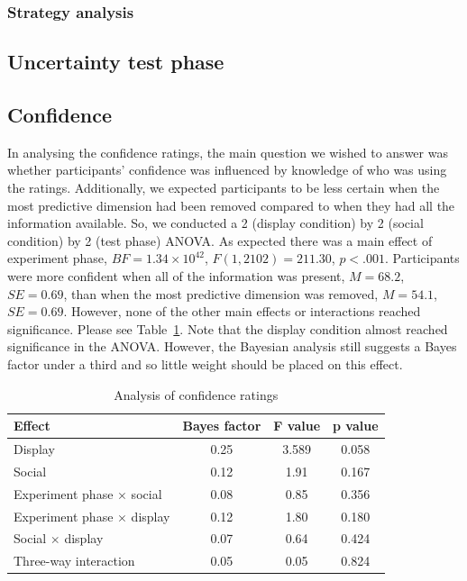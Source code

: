 \documentclass[doc, a4paper, apacite]{apa6}
\begin{document}
\subsubsection{Strategy analysis}



\subsection{Uncertainty test phase}

\subsection{Confidence}
In analysing the confidence ratings, the main question we wished to answer was whether participants' confidence was influenced by knowledge of who was using the ratings. 
Additionally, we expected participants to be less certain when the most predictive dimension had been removed compared to when they had all the information available. 
So, we conducted a 2 (display condition) by 2 (social condition) by 2 (test phase) ANOVA. 
As expected there was a main effect of experiment phase, $BF=1.34 \times 10^{42}$, $F(1, 2102)=211.30$, $p<.001$. 
Participants were more confident when all of the information was present, $M=68.2$, $SE=0.69$, than when the most predictive dimension was removed, $M=54.1$, $SE=0.69$. 
However, none of the other main effects or interactions reached significance. 
Please see Table~\ref{table:confidenceAnalysis}. 
Note that the display condition almost reached significance in the ANOVA. 
However, the Bayesian analysis still suggests a Bayes factor under a third and so little weight should be placed on this effect. 

\begin{table}
	\centering
	\caption{Analysis of confidence ratings}
	\label{table:confidenceAnalysis}
	\begin{tabular}{l c c c}
		\toprule
		Effect & Bayes factor & F value & p value \\
		\midrule
		Display & 0.25 & 3.589 & 0.058 \\
		Social & 0.12 & 1.91 & 0.167 \\
		Experiment phase $\times$ social & 0.08 & 0.85 & 0.356 \\
		Experiment phase $\times$ display & 0.12 & 1.80 & 0.180 \\
		Social $\times$ display & 0.07 & 0.64 & 0.424 \\
		Three-way interaction & 0.05 & 0.05 & 0.824 \\
		\bottomrule
	\end{tabular}
\end{table}

\clearpage
\newpage


\end{document}
